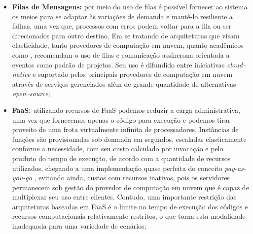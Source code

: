 \documentclass[english,brazilian]{UNISINOSmonografia} %
\begin{document}
\begin{itemize}
	\begin{itemize}
		
		\item \textbf{Filas de Mensagens:}
por meio do uso de filas é possível fornecer ao sistema os meios para se adaptar às variações de demanda e mantê-lo resiliente a falhas, uma vez que, processos com erros podem voltar para a fila ou ser direcionados para outro destino. Em se tratando de arquiteturas que visam elasticidade, tanto provedores de computação em nuvem, quanto acadêmicos como , recomendam o uso de filas e comunicação assíncrona orientada a eventos como padrão de projetos.
Seu uso é difundido entre iniciativas \textit{cloud--native} e suportado pelos principais provedores de computação em nuvem através de serviços gerenciados além de grande quantidade de alternativas \textit{open--source};
		
		\item \textbf{FaaS:}
utilizando recursos de FaaS podemos reduzir a carga administrativa, uma vez que fornecemos apenas o código para execução e podemos tirar proveito de uma frota virtualmente infinita de processadores.
Instâncias de funções são provisionadas sob demanda em segundos, escaladas elasticamente conforme a necessidade, com seu custo calculado por invocação e pelo produto do tempo de execução, de acordo com a quantidade de recursos utilizados, chegando a uma implementação quase perfeita do conceito \textit{pay-as-you-go} \cite{Spillner}, evitando ainda, custos com recursos inativos, pois os servidores permanecem sob gestão do provedor de computação em nuvem que é capaz de multiplexar seu uso entre clientes. 
Contudo, uma importante restrição das arquiteturas baseadas em FaaS é o limite no tempo de execução dos códigos e recursos computacionais relativamente restritos, o que torna esta modalidade inadequada para uma variedade de cenários;


\end{itemize}
\end{itemize}
\end{document}
